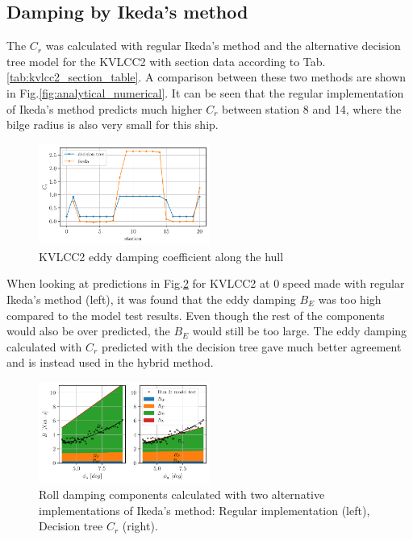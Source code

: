     \subsection*{Damping by Ikeda's method}\label{damping-by-ikedas-method}

    The $C_r$ was calculated with regular Ikeda's method and the
alternative decision tree model for the KVLCC2 with section data
according to Tab.\ref{tab:kvlcc2_section_table}. A comparison
between these two methods are shown in
Fig.\ref{fig:analytical_numerical}. It can be seen that the
regular implementation of Ikeda's method predicts much higher $C_r$
between station 8 and 14, where the bilge radius is also very small for
this ship.

    

    \begin{figure}[H]
        \begin{center}\includegraphics[width = 0.5\textwidth]{figures/kvlcc2_eddy.pdf}\end{center}
        \vspace{-1cm}
        \caption{KVLCC2 eddy damping coefficient along the hull}
        \label{fig:kvlcc2_eddy}
    \end{figure}
    
    When looking at predictions in Fig.\ref{fig:ikeda} for KVLCC2 at
0 speed made with regular Ikeda's method (left), it was found that the
eddy damping $B_E$ was too high compared to the model test results.
Even though the rest of the components would also be over predicted, the
$B_E$ would still be too large. The eddy damping calculated with
$C_r$ predicted with the decision tree gave much better agreement and
is instead used in the hybrid method.

    

    \begin{figure}[H]
        \begin{center}\includegraphics[width = 0.5\textwidth]{figures/ikeda.pdf}\end{center}
        \vspace{-1cm}
        \caption{Roll damping components calculated with two alternative implementations of Ikeda's method: Regular implementation (left), Decision tree $C_r$ (right).}
        \label{fig:ikeda}
    \end{figure}
    
